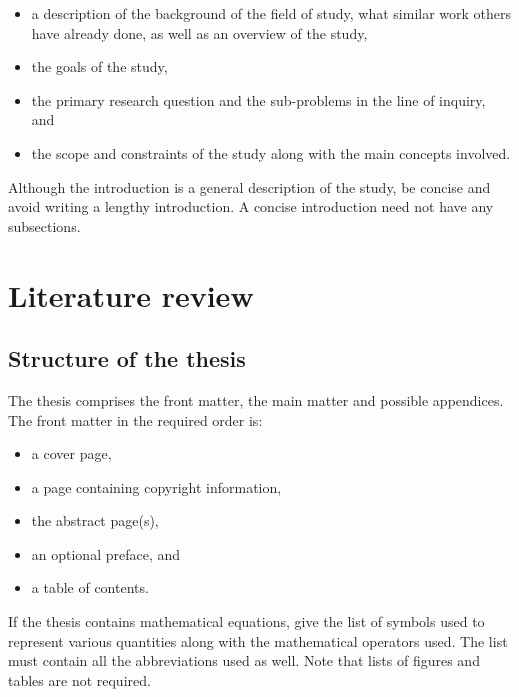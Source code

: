 \documentclass[english, 12pt, a4paper, elec, utf8, a-2b, online]{aaltothesis}
\begin{document}
\begin{itemize}
	\item[--] a description of the background of the field of study, what
	similar work others have already done, as well as an overview of the study,
	\item[--] the goals of the study,
	\item[--] the primary research question and the sub-problems in the line
	of inquiry, and
	\item[--] the scope and constraints of the study along with the main
	concepts involved.
\end{itemize}

Although the introduction is a general description of the study, be concise and 
avoid writing a lengthy introduction. A concise introduction need not have any 
subsections.

\clearpage

\section{Literature review}
\subsection{Structure of the thesis}

The thesis comprises the front matter, the main matter and possible appendices.
The front matter in the required order is:

\begin{itemize}
	\item a cover page,
	\item a page containing copyright information,
	\item the abstract page(s),
	\item an optional preface, and
	\item a table of contents.
\end{itemize}

If the thesis contains mathematical equations, give the list of symbols used to 
represent various quantities along with the mathematical operators used.
The list must contain all the abbreviations used as well. Note that lists of
figures and tables are not required.
\end{document}
